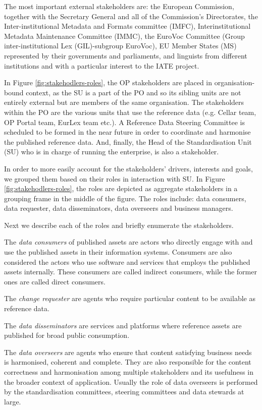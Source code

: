 	The most important external stakeholders are: the European Commission, together with the Secretary General and all of the Commission’s Directorates, the Inter-institutional Metadata and Formats committee (IMFC), Interinstitutional Metadata Maintenance Committee (IMMC), the EuroVoc Committee (Group inter-institutional Lex (GIL)-subgroup EuroVoc), EU Member States (MS) represented by their governments and parliaments, and linguists from different institutions and with a particular interest to the IATE project.
	 
	In Figure \ref{fig:stakehodlers-roles}, the OP stakeholders are placed in organisation-bound context, as the SU is a part of the PO and so its sibling units are not entirely external but are members of the same organisation. The stakeholders within the PO are the various units that use the reference data (e.g. Cellar team, OP Portal team, EurLex team etc.). A Reference Data Steering Committee is scheduled to be formed in the near future in order to coordinate and harmonise the published reference data. And, finally, the Head of the Standardisation Unit (SU) who is in charge of running the enterprise, is also a stakeholder.
	 
	In order to more easily account for the stakeholders' drivers, interests and goals, we grouped them based on their roles in interaction with SU. In Figure \ref{fig:stakehodlers-roles}, the roles are depicted as aggregate stakeholders in a grouping frame in the middle of the figure. The roles include: data consumers, data requester, data disseminators, data overseers and business managers. 
	
	Next we describe each of the roles and briefly enumerate the stakeholders.
	 
	The \textit{data consumers} of published assets are actors who directly engage with and use the published assets in their information systems. Consumers are also considered the actors who use software and services that employs the published assets internally. These consumers are called indirect consumers, while the former ones are called direct consumers.
	
	The \textit{change requester} are agents who require particular content to be available as reference data. 
	
	The \textit{data disseminators} are services and platforms where reference assets are published for broad public consumption.
	
	The \textit{data overseers} are agents who ensure that content satisfying business needs is harmonised, coherent and complete. They are also responsible for the content correctness and harmonisation among multiple stakeholders and its usefulness in the broader context of application. Usually the role of data overseers is performed by the standardisation committees, steering committees and data stewards at large.
	

